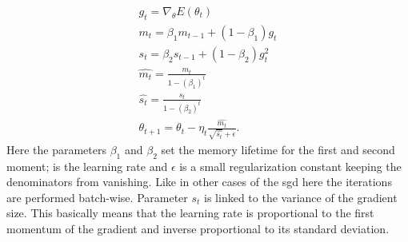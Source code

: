 \begin{equation}
\begin{array}{lcl} 
g_t=\nabla_{\theta}E(\theta_t)\\
m_t=\beta_1 m_{t-1}+(1-\beta_1)g_t\\
s_t=\beta_2 s_{t-1} + (1-\beta_2)g_t^2\\
\hat{m_t}=\frac{m_t}{1-(\beta_1)^t}\\
\hat{s_t}=\frac{s_t}{1-(\beta_2)^t}\\
\theta_{t+1}=\theta_t-\eta_t\frac{\hat{m_t}}{\sqrt{\hat{s_t}}+\epsilon}.
\end{array} 
\end{equation}
Here the parameters $\beta_1$ and $\beta_2$ set the memory lifetime for the first and second moment; \eta is the learning rate and $\epsilon$ is a small regularization constant keeping the denominators from vanishing. Like in other cases of the \gls{sgd} here the iterations are performed batch-wise. Parameter $s_t$ is linked to the variance of the gradient size. This basically means that the learning rate is proportional to the first momentum of the gradient and inverse proportional to its standard deviation.
